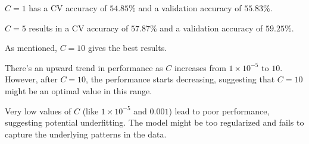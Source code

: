 \documentclass[12pt,a4paper]{article}
\begin{document}
\( C = 1 \) has a CV accuracy of \( 54.85\% \) and a validation accuracy of \( 55.83\% \).

\( C = 5 \) results in a CV accuracy of \( 57.87\% \) and a validation accuracy of \( 59.25\% \).

As mentioned, \( C = 10 \) gives the best results.

There's an upward trend in performance as \( C \) increases from \( 1 \times 10^{-5} \) to \( 10 \). However, after \( C = 10 \), the performance starts decreasing, suggesting that \( C = 10 \) might be an optimal value in this range.

Very low values of \( C \) (like \( 1 \times 10^{-5} \) and \( 0.001 \)) lead to poor performance, suggesting potential underfitting. The model might be too regularized and fails to capture the underlying patterns in the data.
\end{document}
